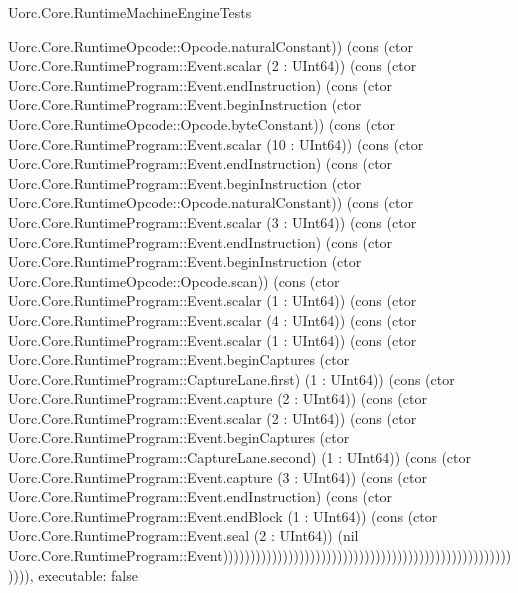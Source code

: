 \begin{lexlean}{Uorc.Core.RuntimeMachineEngineTests}
\begin{semanticmodule}
{Uorc.Core.RuntimeOpcode::Opcode.naturalConstant)) (cons (ctor Uorc.Core.RuntimeProgram::Event.scalar (2 : UInt64)) (cons (ctor Uorc.Core.RuntimeProgram::Event.endInstruction) (cons (ctor Uorc.Core.RuntimeProgram::Event.beginInstruction (ctor Uorc.Core.RuntimeOpcode::Opcode.byteConstant)) (cons (ctor Uorc.Core.RuntimeProgram::Event.scalar (10 : UInt64)) (cons (ctor Uorc.Core.RuntimeProgram::Event.endInstruction) (cons (ctor Uorc.Core.RuntimeProgram::Event.beginInstruction (ctor Uorc.Core.RuntimeOpcode::Opcode.naturalConstant)) (cons (ctor Uorc.Core.RuntimeProgram::Event.scalar (3 : UInt64)) (cons (ctor Uorc.Core.RuntimeProgram::Event.endInstruction) (cons (ctor Uorc.Core.RuntimeProgram::Event.beginInstruction (ctor Uorc.Core.RuntimeOpcode::Opcode.scan)) (cons (ctor Uorc.Core.RuntimeProgram::Event.scalar (1 : UInt64)) (cons (ctor Uorc.Core.RuntimeProgram::Event.scalar (4 : UInt64)) (cons (ctor Uorc.Core.RuntimeProgram::Event.scalar (1 : UInt64)) (cons (ctor Uorc.Core.RuntimeProgram::Event.beginCaptures (ctor Uorc.Core.RuntimeProgram::CaptureLane.first) (1 : UInt64)) (cons (ctor Uorc.Core.RuntimeProgram::Event.capture (2 : UInt64)) (cons (ctor Uorc.Core.RuntimeProgram::Event.scalar (2 : UInt64)) (cons (ctor Uorc.Core.RuntimeProgram::Event.beginCaptures (ctor Uorc.Core.RuntimeProgram::CaptureLane.second) (1 : UInt64)) (cons (ctor Uorc.Core.RuntimeProgram::Event.capture (3 : UInt64)) (cons (ctor Uorc.Core.RuntimeProgram::Event.endInstruction) (cons (ctor Uorc.Core.RuntimeProgram::Event.endBlock (1 : UInt64)) (cons (ctor Uorc.Core.RuntimeProgram::Event.seal (2 : UInt64)) (nil Uorc.Core.RuntimeProgram::Event))))))))))))))))))))))))))))))))))))))))))))))))))))))))),
  executable: false
}


\end{semanticmodule}
\end{lexlean}
